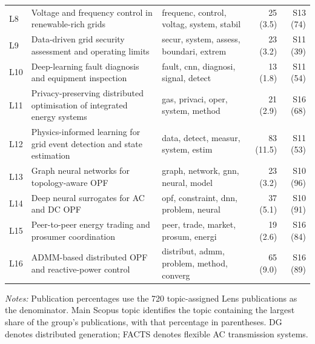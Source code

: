 \documentclass[a4paper,fleqn]{cas-sc}
\begin{document}
\begin{table}[p]
\begin{tabularx}{\textwidth}{
l
>{\raggedright\arraybackslash}X
>{\raggedright\arraybackslash}X
rr}
L8 & Voltage and frequency control in renewable-rich grids
& frequenc, control, voltag, system, stabil
& 25 (3.5) & S13 (74) \\

L9 & Data-driven grid security assessment and operating limits
& secur, system, assess, boundari, extrem
& 23 (3.2) & S11 (39) \\

L10 & Deep-learning fault diagnosis and equipment inspection
& fault, cnn, diagnosi, signal, detect
& 13 (1.8) & S11 (54) \\

L11 & Privacy-preserving distributed optimisation of integrated energy systems
& gas, privaci, oper, system, method
& 21 (2.9) & S16 (68) \\

L12 & Physics-informed learning for grid event detection and state estimation
& data, detect, measur, system, estim
& 83 (11.5) & S11 (53) \\

L13 & Graph neural networks for topology-aware OPF
& graph, network, gnn, neural, model
& 23 (3.2) & S10 (96) \\

L14 & Deep neural surrogates for AC and DC OPF
& opf, constraint, dnn, problem, neural
& 37 (5.1) & S10 (91) \\

L15 & Peer-to-peer energy trading and prosumer coordination
& peer, trade, market, prosum, energi
& 19 (2.6) & S16 (84) \\

L16 & ADMM-based distributed OPF and reactive-power control
& distribut, admm, problem, method, converg
& 65 (9.0) & S16 (89) \\

\bottomrule
\end{tabularx}
\par\smallskip
\begin{minipage}{\textwidth}
\footnotesize
\textit{Notes:} Publication percentages use the 720 topic-assigned Lens publications as the denominator. Main Scopus topic identifies the topic containing the largest share of the group's publications, with that percentage in parentheses. DG denotes distributed generation; FACTS denotes flexible AC transmission systems.
\end{minipage}
\end{table}
\end{document}
